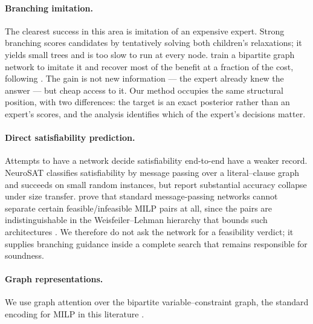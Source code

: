 \documentclass[final,5p,times,twocolumn]{elsarticle}
\begin{document}
\paragraph{Branching imitation.} The clearest success in this area is imitation of an expensive expert. Strong branching scores candidates by tentatively solving both children's relaxations; it yields small trees and is too slow to run at every node. \citet{gasse2019exact} train a bipartite graph network to imitate it and recover most of the benefit at a fraction of the cost, following \citet{khalil2016learning}. The gain is not new information --- the expert already knew the answer --- but cheap access to it. Our method occupies the same structural position, with two differences: the target is an exact posterior rather than an expert's scores, and the analysis identifies which of the expert's decisions matter.

\paragraph{Direct satisfiability prediction.} Attempts to have a network decide satisfiability end-to-end have a weaker record. NeuroSAT \citep{selsam2019neurosat} classifies satisfiability by message passing over a literal--clause graph and succeeds on small random instances, but \citet{li2023g4satbench} report substantial accuracy collapse under size transfer. \citet{chen2023representing} prove that standard message-passing networks cannot separate certain feasible/infeasible MILP pairs at all, since the pairs are indistinguishable in the Weisfeiler--Lehman hierarchy that bounds such architectures \citep{xu2019powerful}. We therefore do not ask the network for a feasibility verdict; it supplies branching guidance inside a complete search that remains responsible for soundness.

\paragraph{Graph representations.} We use graph attention \citep{velickovic2018graph} over the bipartite variable--constraint graph, the standard encoding for MILP in this literature \citep{gasse2019exact}.
\end{document}

